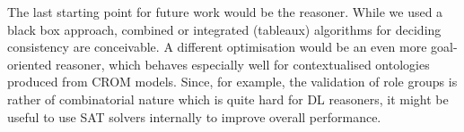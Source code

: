 The last starting point for future work would be the reasoner. While we used a black box approach,
combined or integrated (tableaux) algorithms for deciding consistency are conceivable. A different
optimisation would be an even more goal-oriented reasoner, which behaves especially well for
contextualised ontologies produced from CROM models. Since, for example, the validation of role groups is
rather of combinatorial nature which is quite hard for DL reasoners, it might be useful to use SAT
solvers internally to improve overall performance.





